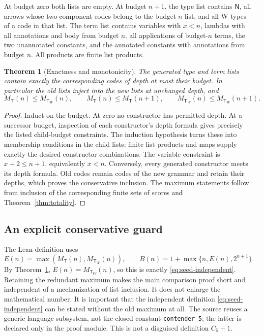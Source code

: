 \documentclass[11pt]{article}
\newtheorem{theorem}{Theorem}[section]
\theoremstyle{definition}
\newcommand{\T}{\mathsf T}
\newcommand{\TW}{\mathsf T_W}
\newcommand{\MT}{M_{\T}}
\newcommand{\MW}{M_{\TW}}
\newcommand{\Cfive}{C_5}
\begin{document}
At budget zero both lists are empty. At budget $n+1$, the type list contains
$\mathsf N$, all arrows whose two component codes belong to the budget-$n$ list,
and all W-types of a code in that list. The term list contains variables with
$x<n$, lambdas with all annotations and body from budget $n$, all applications
of budget-$n$ terms, the two unannotated constants, and the annotated constants
with annotations from budget $n$. All products are finite list products.

\begin{theorem}[Exactness and monotonicity]\label{thm:enumeration}
The generated type and term lists contain exactly the corresponding codes of
depth at most their budget. In particular the old lists inject into the new
lists at unchanged depth, and
\[
  \MT(n)\le\MW(n),\qquad
  \MT(n)\le\MT(n+1),\qquad
  \MW(n)\le\MW(n+1).
\]
\end{theorem}
\begin{proof}
Induct on the budget. At zero no constructor has permitted depth. At a successor
budget, inspection of each constructor's depth formula gives precisely the
listed child-budget constraints. The induction hypothesis turns these into
membership conditions in the child lists; finite list products and maps supply
exactly the desired constructor combinations. The variable constraint is
$x+2\le n+1$, equivalently $x<n$. Conversely, every generated constructor meets
its depth formula. Old codes remain codes of the new grammar and retain their
depths, which proves the conservative inclusion. The maximum statements follow
from inclusion of the corresponding finite sets of scores and
Theorem~\ref{thm:totality}.
\end{proof}

\subsection{An explicit conservative guard}
The Lean definition uses
\begin{equation}\label{eq:guard}
 E(n)=\max(\MT(n),\MW(n)),\qquad
 B(n)=1+\max\{n,E(n),2^{n+1}\}.
\end{equation}
By Theorem~\ref{thm:enumeration}, $E(n)=\MW(n)$, so this is exactly
\eqref{eq:seed-independent}. Retaining the redundant maximum makes the main
comparison proof short and independent of a mechanization of list inclusion.
It does not enlarge the mathematical number. It is important that the
independent definition \eqref{eq:seed-independent} can be stated without the old
maximum at all. The source reuses a generic language subsystem, not the closed
constant \texttt{contender\_5}; the latter is declared only in the proof module.
This is not a disguised definition $\Cfive+1$.
\end{document}
